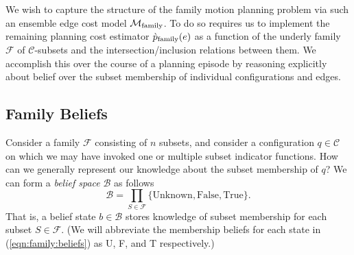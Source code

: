 We wish to capture the structure of the family motion planning problem
via such an ensemble edge cost model $\mathcal{M}_{\mbox{\scriptsize family}}$.
To do so requires us to implement the remaining planning cost estimator
$\grave{p}_{\mbox{\scriptsize family}}(e)$
as a function of the underly family
$\mathcal{F}$ of $\mathcal{C}$-subsets
and the intersection/inclusion relations between them.
We accomplish this over the course of a planning episode
by reasoning explicitly about belief over the subset membership
of individual configurations and edges.


\subsection{Family Beliefs}

Consider a family $\mathcal{F}$ consisting of $n$ subsets,
and consider a configuration $q \in \mathcal{C}$ on which
we may have invoked one or multiple subset indicator functions.
How can we generally represent our knowledge
about the subset membership of $q$?
We can form a \emph{belief space} $\mathcal{B}$ as follows
\begin{equation}
   \mathcal{B} = \prod_{S \in \mathcal{F}}
      \{ \mbox{Unknown}, \mbox{False}, \mbox{True} \}.
   \label{eqn:family:beliefs}
\end{equation}
That is,
a belief state $b \in \mathcal{B}$ stores
knowledge of subset membership for each subset $S \in \mathcal{F}$.
(We will abbreviate the membership beliefs for each state
in (\ref{eqn:family:beliefs})
as U, F, and T respectively.)

